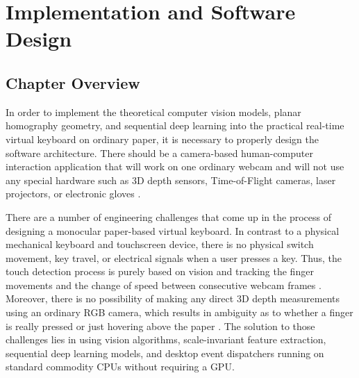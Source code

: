 \chapter{Implementation and Software Design}
\label{ch:implementation}

\section{Chapter Overview}
\label{sec:imp_chapter_overview}
In order to implement the theoretical computer vision models, planar homography geometry, and sequential deep learning into the practical real-time virtual keyboard on ordinary paper, it is necessary to properly design the software architecture. There should be a camera-based human-computer interaction application that will work on one ordinary webcam and will not use any special hardware such as 3D depth sensors, Time-of-Flight cameras, laser projectors, or electronic gloves \cite{ReviewVirtualKeyboard2020, Maman2023TypeNet}.

There are a number of engineering challenges that come up in the process of designing a monocular paper-based virtual keyboard. In contrast to a physical mechanical keyboard and touchscreen device, there is no physical switch movement, key travel, or electrical signals when a user presses a key. Thus, the touch detection process is purely based on vision and tracking the finger movements and the change of speed between consecutive webcam frames \cite{Zhang2020MediaPipe, Ji2018Local}. Moreover, there is no possibility of making any direct 3D depth measurements using an ordinary RGB camera, which results in ambiguity as to whether a finger is really pressed or just hovering above the paper \cite{Thomas2013Camera}. The solution to those challenges lies in using vision algorithms, scale-invariant feature extraction, sequential deep learning models, and desktop event dispatchers running on standard commodity CPUs without requiring a GPU.

